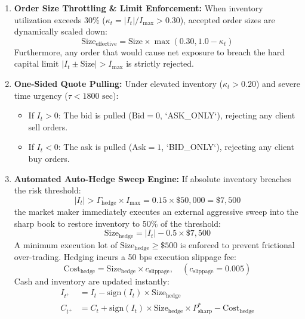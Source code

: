 \documentclass[10pt,twocolumn]{article}
\begin{document}
\begin{enumerate}
    \item \textbf{Order Size Throttling \& Limit Enforcement:} When inventory utilization exceeds 30\% ($\kappa_t = |I_t| / I_{\max} > 0.30$), accepted order sizes are dynamically scaled down:
    \begin{equation}
    \text{Size}_{\text{effective}} = \text{Size} \times \max\left(0.30, 1.0 - \kappa_t\right)
    \end{equation}
    Furthermore, any order that would cause net exposure to breach the hard capital limit $|I_t \pm \text{Size}| > I_{\max}$ is strictly rejected.
    \item \textbf{One-Sided Quote Pulling:} Under elevated inventory ($\kappa_t > 0.20$) and severe time urgency ($\tau < 1800\text{ sec}$):
    \begin{itemize}
        \item If $I_t > 0$: The bid is pulled ($\text{Bid} = 0$, `ASK\_ONLY`), rejecting any client sell orders.
        \item If $I_t < 0$: The ask is pulled ($\text{Ask} = 1$, `BID\_ONLY`), rejecting any client buy orders.
    \end{itemize}
    \item \textbf{Automated Auto-Hedge Sweep Engine:}
    If absolute inventory breaches the risk threshold:
    \begin{equation}
    |I_t| > \Gamma_{\text{hedge}} \times I_{\max} = 0.15 \times \$50,000 = \$7,500
    \end{equation}
    the market maker immediately executes an external aggressive sweep into the sharp book to restore inventory to 50\% of the threshold:
    \begin{equation}
    \text{Size}_{\text{hedge}} = |I_t| - 0.5 \times \$7,500
    \end{equation}
    A minimum execution lot of $\text{Size}_{\text{hedge}} \ge \$500$ is enforced to prevent frictional over-trading. Hedging incurs a 50 bps execution slippage fee:
    \begin{equation}
    \text{Cost}_{\text{hedge}} = \text{Size}_{\text{hedge}} \times c_{\text{slippage}}, \quad (c_{\text{slippage}} = 0.005)
    \end{equation}
    Cash and inventory are updated instantly:
    \begin{align}
    I_{t^+} &= I_t - \text{sign}(I_t) \times \text{Size}_{\text{hedge}} \\
    C_{t^+} &= C_t + \text{sign}(I_t) \times \text{Size}_{\text{hedge}} \times P^*_{\text{sharp}} - \text{Cost}_{\text{hedge}}
    \end{align}
\end{enumerate}
\end{document}
